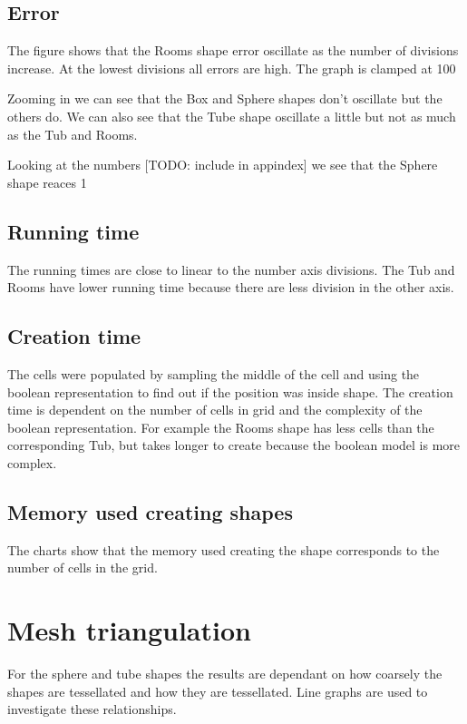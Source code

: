 \documentclass[11pt,twoside,a4paper]{report}
\begin{document}
\subsection{Error}
The figure shows that the Rooms shape error oscillate as the number of divisions increase. At the lowest divisions all errors are high. The graph is clamped at 100%

Zooming in we can see that the Box and Sphere shapes don’t oscillate but the others do. We can also see that the Tube shape oscillate a little but not as much as the Tub and Rooms.

Looking at the numbers [TODO: include in appindex] we see that the Sphere shape reaces 1%

\subsection{Running time}
The running times are close to linear to the number axis divisions. The Tub and Rooms have lower running time because there are less division in the other axis.

\subsection{Creation time}
The cells were populated by sampling the middle of the cell and using the boolean representation to find out if the position was inside shape. The creation time is dependent on the number of cells in grid and the complexity of the boolean representation. For example the Rooms shape has less cells than the corresponding Tub, but takes longer to create because the boolean model is more complex.

\subsection{Memory used creating shapes}
The charts show that the memory used creating the shape corresponds to the number of cells in the grid.

\section{Mesh triangulation}
For the sphere and tube shapes the results are dependant on how coarsely the shapes are tessellated and how they are tessellated. Line graphs are used to investigate these relationships.
\end{document}
